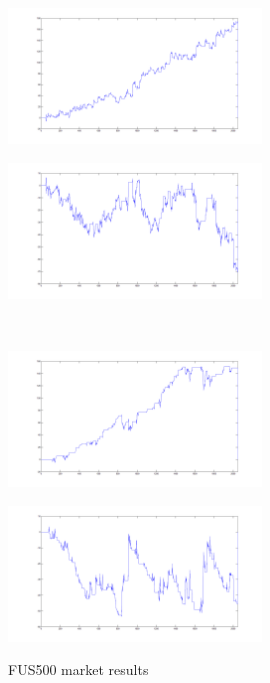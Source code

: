 \documentclass{tewiart}
\begin{document}
\begin{figure}[h]
\centering
\begin{minipage}{\linewidth}
\centering
\includegraphics[width=0.6\textwidth]{images/fus500A.png}
\label{jedno}
\end{minipage}
\begin{minipage}{\linewidth}
\centering
\includegraphics[width=0.6\textwidth]{images/fus500B.png}
\label{dwu}
\end{minipage}
\\
\begin{minipage}{\linewidth}
\centering
\includegraphics[width=0.6\textwidth]{images/fus500C.png}
\label{cztero}
\end{minipage}
\begin{minipage}{\linewidth}
\centering
\includegraphics[width=0.6\textwidth]{images/fus500D.png}
\label{mansard}
\end{minipage}
\caption{FUS500 market results}
\end{figure}
\end{document}

